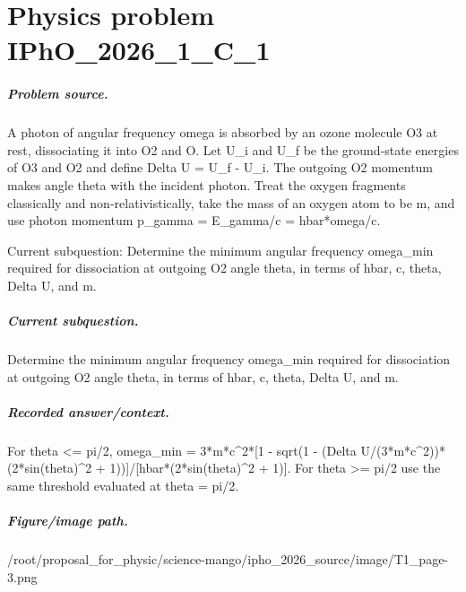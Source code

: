 
\chapter{Physics problem IPhO\_2026\_1\_C\_1}
\label{ch:IPhO2026Problems_problem_IPhO_2026_1_C_1}

\paragraph{Problem source.}
A photon of angular frequency omega is absorbed by an ozone molecule O3 at rest,
dissociating it into O2 and O.  Let U\_i and U\_f be the ground-state energies of
O3 and O2 and define Delta U = U\_f - U\_i.  The outgoing O2 momentum makes angle
theta with the incident photon.  Treat the oxygen fragments classically and
non-relativistically, take the mass of an oxygen atom to be m, and use photon
momentum p\_gamma = E\_gamma/c = hbar*omega/c.

Current subquestion:
Determine the minimum angular frequency omega\_min required for dissociation at outgoing O2 angle theta, in terms of hbar, c, theta, Delta U, and m.

\paragraph{Current subquestion.}
Determine the minimum angular frequency omega\_min required for dissociation at outgoing O2 angle theta, in terms of hbar, c, theta, Delta U, and m.

\paragraph{Recorded answer/context.}
For theta <= pi/2, omega\_min = 3*m*c\textasciicircum{}2*[1 - sqrt(1 - (Delta U/(3*m*c\textasciicircum{}2))*(2*sin(theta)\textasciicircum{}2 + 1))]/[hbar*(2*sin(theta)\textasciicircum{}2 + 1)]. For theta >= pi/2 use the same threshold evaluated at theta = pi/2.

\paragraph{Figure/image path.}
/root/proposal\_for\_physic/science-mango/ipho\_2026\_source/image/T1\_page-3.png

